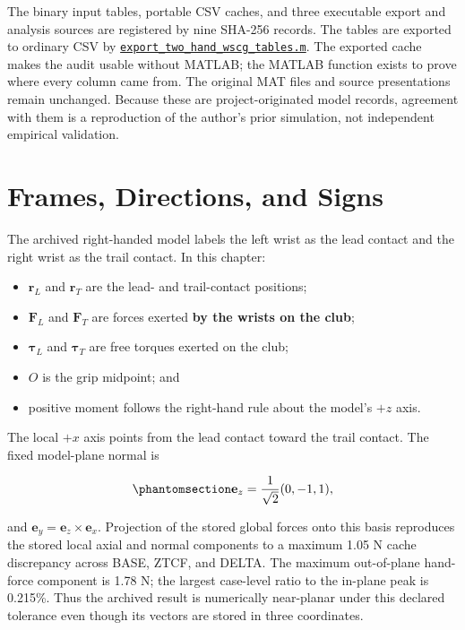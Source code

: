 \documentclass[
  letterpaper,
]{report}
\providecommand{\tightlist}{%
  \setlength{\itemsep}{0pt}\setlength{\parskip}{0pt}}
\begin{document}
The binary input tables, portable CSV caches, and three executable
export and analysis sources are registered by nine SHA-256 records. The
tables are exported to ordinary CSV by
\href{https://github.com/D-sorganization/UpstreamDrift/blob/main/scripts/research/proximal_distal_energy/export_two_hand_wscg_tables.m}{\texttt{export\_two\_hand\_wscg\_tables.m}}.
The exported cache makes the audit usable without MATLAB; the MATLAB
function exists to prove where every column came from. The original MAT
files and source presentations remain unchanged. Because these are
project-originated model records, agreement with them is a reproduction
of the author's prior simulation, not independent empirical validation.

\section{Frames, Directions, and Signs}\label{sec-two-hand-frames}

The archived right-handed model labels the left wrist as the lead
contact and the right wrist as the trail contact. In this chapter:

\begin{itemize}
\tightlist
\item
  \(\mathbf r_L\) and \(\mathbf r_T\) are the lead- and trail-contact
  positions;
\item
  \(\mathbf F_L\) and \(\mathbf F_T\) are forces exerted \textbf{by the
  wrists on the club};
\item
  \(\boldsymbol{\tau}_L\) and \(\boldsymbol{\tau}_T\) are free torques
  exerted on the club;
\item
  \(O\) is the grip midpoint; and
\item
  positive moment follows the right-hand rule about the model's \(+z\)
  axis.
\end{itemize}

The local \(+x\) axis points from the lead contact toward the trail
contact. The fixed model-plane normal is

\begin{equation}\phantomsection\label{eq-model-plane-normal}{
\mathbf e_z = \frac{1}{\sqrt{2}}(0,-1,1),
}\end{equation}

and \(\mathbf e_y=\mathbf e_z\times\mathbf e_x\). Projection of the
stored global forces onto this basis reproduces the stored local axial
and normal components to a maximum 1.05 N cache discrepancy across BASE,
ZTCF, and DELTA. The maximum out-of-plane hand-force component is 1.78
N; the largest case-level ratio to the in-plane peak is 0.215\%. Thus
the archived result is numerically near-planar under this declared
tolerance even though its vectors are stored in three coordinates.
\end{document}
